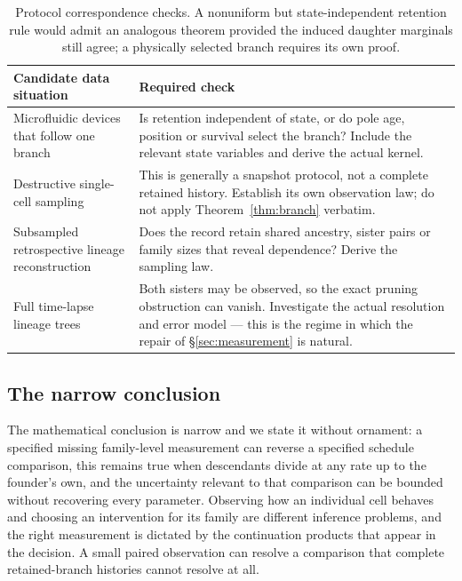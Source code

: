 \documentclass[11pt]{article}
\theoremstyle{plain}
\theoremstyle{definition}
\theoremstyle{remark}
\begin{document}
\begin{table}[tb]
\centering\small
\caption{Protocol correspondence checks. A nonuniform but state-independent
retention rule would admit an analogous theorem provided the induced daughter
marginals still agree; a physically selected branch requires its own proof.}
\label{tab:platform}
\begin{tabularx}{\linewidth}{@{}lX@{}}
\toprule
Candidate data situation & Required check\\\midrule
Microfluidic devices that follow one branch \citep{Wang2010}
 & Is retention independent of state, or do pole age, position or survival
   select the branch? Include the relevant state variables and derive the
   actual kernel.\\
Destructive single-cell sampling
 & This is generally a snapshot protocol, not a complete retained history.
   Establish its own observation law; do not apply Theorem~\ref{thm:branch}
   verbatim.\\
Subsampled retrospective lineage reconstruction
 & Does the record retain shared ancestry, sister pairs or family sizes that
   reveal dependence? Derive the sampling law.\\
Full time-lapse lineage trees \citep{Sandler2015,Spencer2009}
 & Both sisters may be observed, so the exact pruning obstruction can vanish.
   Investigate the actual resolution and error model --- this is the regime in
   which the repair of \S\ref{sec:measurement} is natural.\\
\bottomrule
\end{tabularx}
\end{table}

\subsection{The narrow conclusion}

The mathematical conclusion is narrow and we state it without ornament: a
specified missing family-level measurement can reverse a specified schedule
comparison, this remains true when descendants divide at any rate up to the
founder's own, and the uncertainty relevant to that comparison can be bounded
without recovering every parameter. Observing how an individual cell behaves and
choosing an intervention for its family are different inference problems, and
the right measurement is dictated by the continuation products that appear in
the decision. A small paired observation can resolve a comparison that complete
retained-branch histories cannot resolve at all.
\end{document}
